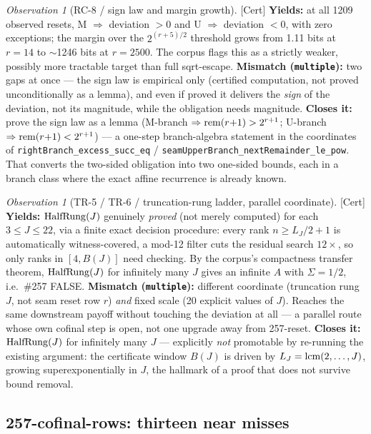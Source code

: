 \documentclass[11pt]{article}
\theoremstyle{plain}
\theoremstyle{definition}
\theoremstyle{remark}
\newtheorem{obs}[thm]{Observation}
\let\origmathrm\mathrm
\renewcommand{\mathrm}[1]{\ifmmode\origmathrm{#1}\else\textrm{#1}\fi}%
\newcommand{\ev}[1]{{\small\textsf{[#1]}}\xspace}
\begin{document}
\begin{obs}[RC-8 / sign law and margin growth] \ev{Cert}
\textbf{Yields:} at all 1209 observed resets, M $\Rightarrow$ deviation $>0$ and U $\Rightarrow$
deviation $<0$, with zero exceptions; the margin over the $2^{(r+5)/2}$ threshold grows from
1.11 bits at $r=14$ to $\sim$1246 bits at $r=2500$. The corpus flags this as a strictly weaker,
possibly more tractable target than full sqrt-escape.
\textbf{Mismatch (\texttt{multiple}):} two gaps at once — the sign law is empirical only
(certified computation, not proved unconditionally as a lemma), and even if proved it delivers
the \emph{sign} of the deviation, not its magnitude, while the obligation needs magnitude.
\textbf{Closes it:} prove the sign law as a lemma (M-branch $\Rightarrow \mathrm{rem}(r{+}1) >
2^{r+1}$; U-branch $\Rightarrow \mathrm{rem}(r{+}1) < 2^{r+1}$) — a one-step branch-algebra
statement in the coordinates of \texttt{rightBranch\_excess\_succ\_eq} /
\texttt{seamUpperBranch\_nextRemainder\_le\_pow}. That converts the two-sided obligation into two
one-sided bounds, each in a branch class where the exact affine recurrence is already known.
\end{obs}

\begin{obs}[TR-5 / TR-6 / truncation-rung ladder, parallel coordinate] \ev{Cert}
\textbf{Yields:} $\mathrm{HalfRung}(J)$ genuinely \emph{proved} (not merely computed) for each $3
\le J \le 22$, via a finite exact decision procedure: every rank $n \ge L_J/2+1$ is automatically
witness-covered, a mod-12 filter cuts the residual search $12\times$, so only ranks in
$[4,B(J)]$ need checking. By the corpus's compactness transfer theorem, $\mathrm{HalfRung}(J)$
for infinitely many $J$ gives an infinite $A$ with $\Sigma = 1/2$, i.e.\ \#257 FALSE.
\textbf{Mismatch (\texttt{multiple}):} different coordinate (truncation rung $J$, not seam reset
row $r$) \emph{and} fixed scale (20 explicit values of $J$). Reaches the same downstream payoff
without touching the deviation at all — a parallel route whose own cofinal step is open, not one
upgrade away from 257-reset.
\textbf{Closes it:} $\mathrm{HalfRung}(J)$ for infinitely many $J$ — explicitly \emph{not}
promotable by re-running the existing argument: the certificate window $B(J)$ is driven by $L_J
= \mathrm{lcm}(2,\dots,J)$, growing superexponentially in $J$, the hallmark of a proof that does
not survive bound removal.
\end{obs}

\subsection{257-cofinal-rows: thirteen near misses}
\end{document}
